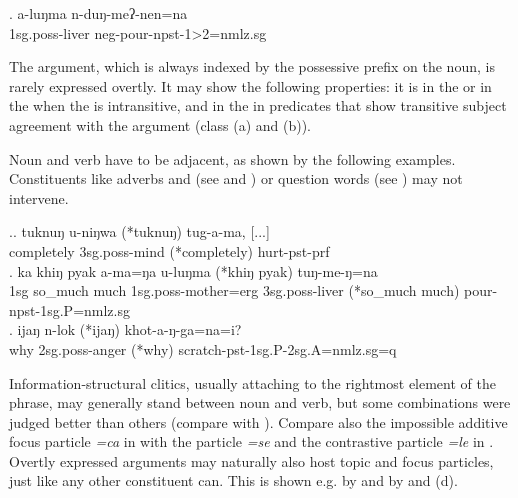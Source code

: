 \exg. a-luŋma n-duŋ-meʔ-nen=na\\
		{\sc 1sg.poss}-liver {\sc neg-}pour{\sc -npst-1>2=nmlz.sg}\\


The  argument, which is always indexed by the possessive prefix on the noun, is rarely expressed overtly. It may show the following properties: it is in the  or in the  when the  is intransitive, and in the  in predicates that show transitive subject agreement with the  argument (class (a) and (b)). 

Noun and verb have to be adjacent, as shown by the following examples. Constituents like  adverbs and   (see \Next[a] and \Next[b]) or question words (see \Next[c]) may not intervene. 

\ex.\ag. tuknuŋ u-niŋwa (*tuknuŋ) tug-a-ma, [...]\\
 completely {\sc 3sg.poss}-mind  (*completely) hurt{\sc [3sg]-pst-prf}\\
  
 \bg. ka khiŋ pyak a-ma=ŋa u-luŋma  (*khiŋ pyak) tuŋ-me-ŋ=na\\
 {\sc 1sg} so\_much much {\sc 1sg.poss-}mother{\sc =erg} {\sc 3sg.poss-}liver (*so\_much much) pour{\sc [ 3sg.A]-npst-1sg.P=nmlz.sg}\\
 \bg. ijaŋ n-lok (*ijaŋ) khot-a-ŋ-ga=na=i?\\
 why	{\sc 2sg.poss}-anger (*why) scratch{\sc -pst-1sg.P-2sg.A=nmlz.sg=q}\\


Information-structural clitics, usually attaching to the rightmost element of the phrase, may generally stand between noun and verb, 
but some combinations were judged better than others (compare \Next[a] with \Next[b]). Compare also the impossible additive focus particle \emph{=ca} in \Next[a] with the  particle \emph{=se} and the contrastive particle \emph{=le} in \NNext. Overtly expressed  arguments  may naturally also host topic and focus particles, just like any other constituent can. This is shown e.g. by \Next[b] and by \NNext[c] and (d).


